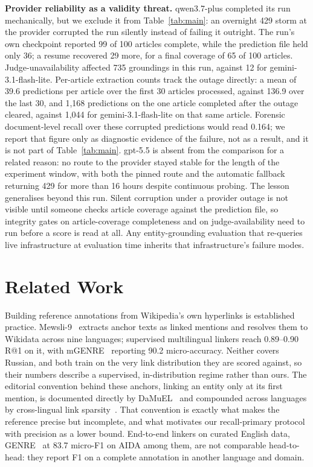 \documentclass[sigconf,review]{acmart}
\begin{document}
\textbf{Provider reliability as a validity threat.} qwen3.7-plus completed
its run mechanically, but we exclude it from Table~\ref{tab:main}: an
overnight 429 storm at the provider corrupted the run silently instead of
failing it outright. The run's own checkpoint reported 99 of 100 articles
complete, while the prediction file held only 36; a resume recovered 29
more, for a final coverage of 65 of 100 articles. Judge-unavailability
affected 735 groundings in this run, against 12 for gemini-3.1-flash-lite.
Per-article extraction counts track the outage directly: a mean of 39.6
predictions per article over the first 30 articles processed, against 136.9
over the last 30, and 1,168 predictions on the one article completed after
the outage cleared, against 1,044 for gemini-3.1-flash-lite on that same
article. Forensic document-level recall over these corrupted predictions
would read 0.164; we report that figure only as diagnostic evidence of the
failure, not as a result, and it is not part of Table~\ref{tab:main}.
gpt-5.5 is absent from the comparison for a related reason: no route to the
provider stayed stable for the length of the experiment window, with both
the pinned route and the automatic fallback returning 429 for more than 16
hours despite continuous probing. The lesson generalises beyond this run.
Silent corruption under a provider outage is not visible until someone
checks article coverage against the prediction file, so integrity gates on
article-coverage completeness and on judge-availability need to run before
a score is read at all. Any entity-grounding evaluation that re-queries live
infrastructure at evaluation time inherits that infrastructure's failure
modes.

\section{Related Work}
\label{sec:related}

Building reference annotations from Wikipedia's own hyperlinks is
established practice. Mewsli-9~\citep{botha2020mewsli} extracts anchor texts
as linked mentions and resolves them to Wikidata across nine languages;
supervised multilingual linkers reach 0.89--0.90 R@1 on it, with
mGENRE~\citep{decao2022mgenre} reporting 90.2 micro-accuracy. Neither covers
Russian, and both train on the very link distribution they are scored
against, so their numbers describe a supervised, in-distribution regime
rather than ours. The editorial convention behind these anchors, linking an
entity only at its first mention, is documented directly by
DaMuEL~\citep{damuel2023} and compounded across languages by cross-lingual
link sparsity~\citep{gerlach2021}. That convention is exactly what makes the
reference precise but incomplete, and what motivates our recall-primary
protocol with precision as a lower bound. End-to-end linkers on curated
English data, GENRE~\citep{decao2021genre} at 83.7 micro-F1 on AIDA among
them, are not comparable head-to-head: they report F1 on a complete
annotation in another language and domain.
\end{document}
